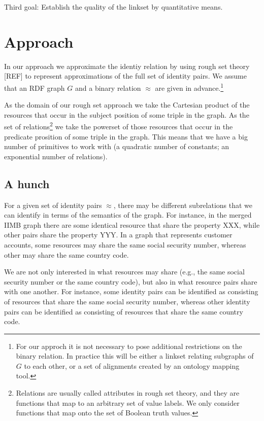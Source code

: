 \documentclass[11pt,a4paper,notitlepage,onecolumn,twoside]{article}
\begin{document}
Third goal: Establish the quality of the linkset by quantitative means.

\section{Approach}

In our approach we approximate the identiy relation by using rough set theory [REF] to represent approximations of the full set of identity pairs. We assume that an RDF graph $G$ and a binary relation $\approx$ are given in advance.\footnote{For our approch it is not necessary to pose additional restrictions on the binary relation. In practice this will be either a linkset relating subgraphs of $G$ to each other, or a set of alignments created by an ontology mapping tool.}

As the domain of our rough set approach we take the Cartesian product of the resources that occur in the subject position of some triple in the graph. As the set of relations\footnote{Relations are usually called attributes in rough set theory, and they are functions that map to an arbitrary set of value labels. We only consider functions that map onto the set of Boolean truth values.} we take the powerset of those resources that occur in the predicate prosition of some triple in the graph. This means that we have a big number of primitives to work with (a quadratic number of constants; an exponential number of relations).

\subsection{A hunch}

For a given set of identity pairs $\approx$, there may be different subrelations that we can identify in terms of the semantics of the graph. For instance, in the merged IIMB graph there are some identical resource that share the property XXX, while other pairs share the property YYY. In a graph that represents customer accounts, some resources may share the same social security number, whereas other may share the same country code.

We are not only interested in what resources may share (e.g., the same social security number or the same country code), but also in what resource pairs share with one another. For instance, some identity pairs can be identified as consisting of resources that share the same social security number, whereas other identity pairs can be identified as consisting of resources that share the same country code.
\end{document}
